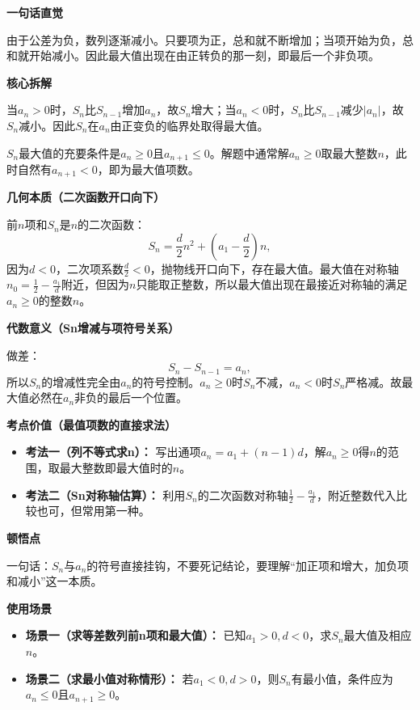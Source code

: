 \begin{explanationbox}

	\textbf{\textcolor{CExplanation}{一句话直觉}}

	由于公差为负，数列逐渐减小。只要项为正，总和就不断增加；当项开始为负，总和就开始减小。因此最大值出现在由正转负的那一刻，即最后一个非负项。

	\medskip
	\textbf{\textcolor{CExplanation}{核心拆解}}
	\begin{description}[style=nextline, leftmargin=2.8em, labelsep=0.5em, itemsep=0.45em]
		\item[\textbf{要点一（项符号决定增减）：}] 当$a_n>0$时，$S_n$比$S_{n-1}$增加$a_n$，故$S_n$增大；当$a_n<0$时，$S_n$比$S_{n-1}$减少$|a_n|$，故$S_n$减小。因此$S_n$在$a_n$由正变负的临界处取得最大值。
		\item[\textbf{要点二（临界条件具体化）：}] $S_n$最大值的充要条件是$a_n\ge 0$且$a_{n+1}\le 0$。解题中通常解$a_n\ge 0$取最大整数$n$，此时自然有$a_{n+1}<0$，即为最大值项数。
	\end{description}

	\medskip
	\textbf{\textcolor{CExplanation}{几何本质（二次函数开口向下）}}

	前$n$项和$S_n$是$n$的二次函数：
	\[
		S_n = \frac{d}{2}n^2 + \left(a_1-\frac{d}{2}\right)n,
	\]
	因为$d<0$，二次项系数$\frac{d}{2}<0$，抛物线开口向下，存在最大值。最大值在对称轴$n_0 = \frac{1}{2} - \frac{a_1}{d}$附近，但因为$n$只能取正整数，所以最大值出现在最接近对称轴的满足$a_n\ge 0$的整数$n$。

	\medskip
	\textbf{\textcolor{CExplanation}{代数意义（Sn增减与项符号关系）}}

	做差：
	\[
		S_n - S_{n-1} = a_n,
	\]
	所以$S_n$的增减性完全由$a_n$的符号控制。$a_n\ge 0$时$S_n$不减，$a_n<0$时$S_n$严格减。故最大值必然在$a_n$非负的最后一个位置。

	\medskip
	\textbf{\textcolor{CExplanation}{考点价值（最值项数的直接求法）}}
	\begin{itemize}[leftmargin=*, itemsep=0.5em, topsep=0.4em]
		\item \textbf{考法一（列不等式求n）：} 写出通项$a_n = a_1+(n-1)d$，解$a_n\ge 0$得$n$的范围，取最大整数即最大值时的$n$。
		\item \textbf{考法二（Sn对称轴估算）：} 利用$S_n$的二次函数对称轴$\frac{1}{2}-\frac{a_1}{d}$，附近整数代入比较也可，但常用第一种。
	\end{itemize}

	\medskip
	\textbf{\textcolor{CExplanation}{顿悟点}}

	一句话：$S_n$与$a_n$的符号直接挂钩，不要死记结论，要理解“加正项和增大，加负项和减小”这一本质。

	\medskip
	\textbf{\textcolor{CExplanation}{使用场景}}
	\begin{itemize}[leftmargin=*, itemsep=0.5em, topsep=0.4em]
		\item \textbf{场景一（求等差数列前n项和最大值）：} 已知$a_1>0,d<0$，求$S_n$最大值及相应$n$。
		\item \textbf{场景二（求最小值对称情形）：} 若$a_1<0,d>0$，则$S_n$有最小值，条件应为$a_n\le 0$且$a_{n+1}\ge 0$。
	\end{itemize}

\end{explanationbox}

